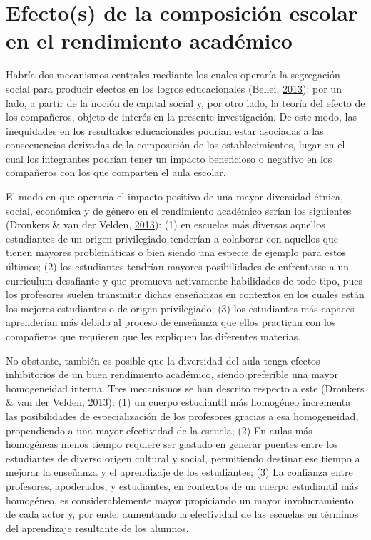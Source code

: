 \documentclass[
]{article}
\begin{document}
\hypertarget{efectos-de-la-composiciuxf3n-escolar-en-el-rendimiento-acaduxe9mico}{%
\section{Efecto(s) de la composición escolar en el rendimiento
académico}\label{efectos-de-la-composiciuxf3n-escolar-en-el-rendimiento-acaduxe9mico}}

Habría dos mecanismos centrales mediante los cuales operaría la
segregación social para producir efectos en los logros educacionales
(Bellei, \protect\hyperlink{ref-bellei_estudio_2013}{2013}): por un
lado, a partir de la noción de capital social y, por otro lado, la
teoría del efecto de los compañeros, objeto de interés en la presente
investigación. De este modo, las inequidades en los resultados
educacionales podrían estar asociadas a las consecuencias derivadas de
la composición de los establecimientos, lugar en el cual los integrantes
podrían tener un impacto beneficioso o negativo en los compañeros con
los que comparten el aula escolar.

El modo en que operaría el impacto positivo de una mayor diversidad
étnica, social, económica y de género en el rendimiento académico serían
los siguientes (Dronkers \& van der Velden,
\protect\hyperlink{ref-dronkers_positive_2013a}{2013}): (1) en escuelas
más diversas aquellos estudiantes de un origen privilegiado tenderían a
colaborar con aquellos que tienen mayores problemáticas o bien siendo
una especie de ejemplo para estos últimos; (2) los estudiantes tendrían
mayores posibilidades de enfrentarse a un curriculum desafiante y que
promueva activamente habilidades de todo tipo, pues los profesores
suelen transmitir dichas enseñanzas en contextos en los cuales están los
mejores estudiantes o de origen privilegiado; (3) los estudiantes más
capaces aprenderían más debido al proceso de enseñanza que ellos
practican con los compañeros que requieren que les expliquen las
diferentes materias.

No obstante, también es posible que la diversidad del aula tenga efectos
inhibitorios de un buen rendimiento académico, siendo preferible una
mayor homogeneidad interna. Tres mecanismos se han descrito respecto a
este (Dronkers \& van der Velden,
\protect\hyperlink{ref-dronkers_positive_2013a}{2013}): (1) un cuerpo
estudiantil más homogéneo incrementa las posibilidades de
especialización de los profesores gracias a esa homogeneidad,
propendiendo a una mayor efectividad de la escuela; (2) En aulas más
homogéneas menos tiempo requiere ser gastado en generar puentes entre
los estudiantes de diverso origen cultural y social, permitiendo
destinar ese tiempo a mejorar la enseñanza y el aprendizaje de los
estudiantes; (3) La confianza entre profesores, apoderados, y
estudiantes, en contextos de un cuerpo estudiantil más homogéneo, es
considerablemente mayor propiciando un mayor involucramiento de cada
actor y, por ende, aumentando la efectividad de las escuelas en términos
del aprendizaje resultante de los alumnos.
\end{document}
